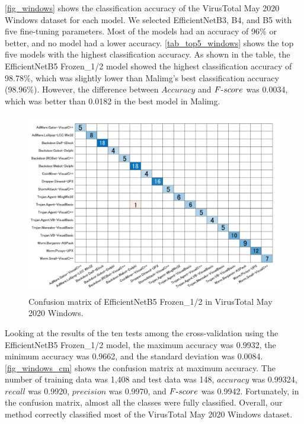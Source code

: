 \documentclass[conference]{IEEEtran}
\begin{document}
\autoref{fig_windows} shows the classification accuracy of the VirusTotal May 2020 Windows dataset for each model. 
We selected EfficientNetB3, B4, and B5 with five fine-tuning parameters. 
Most of the models had an accuracy of 96\% or better, and no model had a lower accuracy.
\autoref{tab_top5_windows} shows the top five models with the highest classification accuracy. 
As shown in the table, the EfficientNetB5 Frozen\_1/2 model showed the highest classification accuracy of 98.78\%, which was slightly lower than Malimg's best classification accuracy (98.96\%). 
However, the difference between $Accuracy$ and $F\mathchar`-score$ was 0.0034, which was better than 0.0182 in the best model in Malimg.

\begin{figure}[t]
  \centering
  \includegraphics[width=\linewidth,clip]{Win_EfficientNetB5_CM_18.pdf}
  \caption{Confusion matrix of EfficientNetB5 Frozen\_1/2 in VirusTotal May 2020 Windows.}
  \label{fig_windows_cm}
\end{figure}

Looking at the results of the ten tests among the cross-validation using the EfficientNetB5 Frozen\_1/2 model, the maximum accuracy was 0.9932, the minimum accuracy was 0.9662, and the standard deviation was 0.0084. 
\autoref{fig_windows_cm} shows the confusion matrix at maximum accuracy. 
The number of training data was 1,408 and test data was 148, $accuracy$ was 0.99324, $recall$ was 0.9920, $precision$ was 0.9970, and $F\mathchar`-score$ was 0.9942. Fortunately, in the confusion matrix, almost all the classes were fully classified. 
Overall, our method correctly classified most of the VirusTotal May 2020 Windows dataset. 
\end{document}
